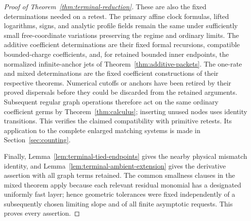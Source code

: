 \begin{proof}[Proof of Theorem~\ref{thm:terminal-reduction}]
These are also the fixed determinations needed on a retest.  The primary
affine clock formulas, lifted logarithms, signs, and analytic profile fields
remain the same under sufficiently small free-coordinate variations
preserving the regime and ordinary limits.  The additive coefficient
determinations are their fixed formal recursions, compatible bounded-charge
coefficients, and, for retained bounded inner endpoints, the normalized
infinite-anchor jets of Theorem~\ref{thm:additive-packets}.  The one-rate
and mixed determinations are the fixed coefficient constructions of their
respective theorems.  Numerical cutoffs or anchors have been retired by
their proved dispersals before they could be discarded from the retained
arguments.  Subsequent regular graph operations therefore act on the same
ordinary coefficient germs by Theorem~\ref{thm:calculus}; inserting unused
nodes uses identity transitions.  This verifies the claimed compatibility
with primitive retests.  Its application to the complete enlarged
matching systems is made in Section~\ref{sec:counting}.

Finally, Lemma~\ref{lem:terminal-tied-endpoints} gives the nearby physical
mismatch identity, and Lemma~\ref{lem:terminal-ambient-extension} gives
the derivative assertion with all graph terms retained.  The common
smallness clauses in the mixed theorem apply because each relevant
residual monomial has a designated uniformly fast layer; hence geometric
tolerances were fixed independently of a subsequently chosen limiting
slope and of all finite asymptotic requests.  This proves every assertion.
\end{proof}
